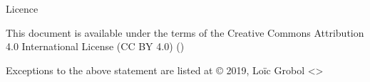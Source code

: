 \documentclass[hyperref={unicode}, xcolor={svgnames}, french]{beamer}
\begin{document}
\begin{frame}{Licence}
    \begin{center}
        {\huge \ccby}
        \vfill
        This document is available under the terms of the Creative Commons Attribution 4.0 International License (CC BY 4.0) ()

        Exceptions to the above statement are listed at {\small{}}
        \vfill
        © 2019, Loïc Grobol <>

    \end{center}
\end{frame}
\end{document}
